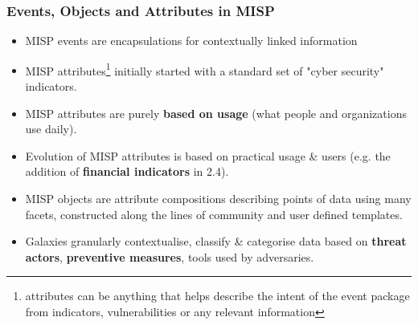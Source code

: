 \begin{frame}
        \frametitle{Events, Objects and Attributes in MISP}
         \begin{itemize}
                \item MISP events are encapsulations for contextually linked information
                \item MISP attributes\footnote{attributes can be anything that helps describe the intent of the event package from indicators, vulnerabilities or any relevant information} initially started with a standard set of "cyber security" indicators.
                \item MISP attributes are purely {\bf based on usage} (what people and organizations use daily).
                \item Evolution of MISP attributes is based on practical usage \& users (e.g. the addition of {\bf financial indicators} in 2.4).
                \item MISP objects are attribute compositions describing points of data using many facets, constructed along the lines of community and user defined templates.
                \item Galaxies granularly contextualise, classify \& categorise data based on {\bf threat actors}, {\bf preventive measures}, tools used by adversaries.
        \end{itemize}
\end{frame}
